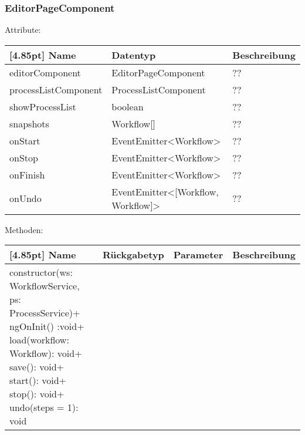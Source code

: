         	\subsubsection{EditorPageComponent}
        	
        	    Attribute:
                \begin{center}
                	\renewcommand{\arraystretch}{1.5}
                    \setlength\tabcolsep{5pt}
                	\begin{tabularx}{\textwidth}{|l|l|X|}
                		\hline
                        \rowcolor[gray]{0.75}[4.85pt]            		
                        Name & Datentyp & Beschreibung \\ \hline
                        editorComponent  & EditorPageComponent & ?? \\ \hline
                        processListComponent  & ProcessListComponent & ?? \\ \hline
                        showProcessList  & boolean & ?? \\ \hline
                        snapshots  & Workflow[] & ?? \\ \hline
                        onStart  & EventEmitter<Workflow> & ?? \\ \hline
                        onStop  & EventEmitter<Workflow> & ?? \\ \hline
                        onFinish  & EventEmitter<Workflow> & ?? \\ \hline
                        onUndo  & EventEmitter<[Workflow, Workflow]> & ?? \\ \hline
                	\end{tabularx}
                \end{center}
                
                Methoden:
        		\begin{center}
                \setlength\tabcolsep{5pt}
                	\renewcommand{\arraystretch}{1.5}
                    	\begin{tabularx}{\textwidth}{|l|l|l|X|}
                    	\hline
                    	\rowcolor[gray]{0.75}[4.85pt]
                		Name & Rückgabetyp & Parameter & Beschreibung \\ \hline 
                		constructor(ws: WorkflowService, ps: ProcessService)+ ngOnInit() :void+ load(workflow: Workflow): void+ save(): void+ start(): void+ stop(): void+ undo(steps = 1): void
                        & & &  \\ \hline
                        \end{tabularx}
        		\end{center}
        	
